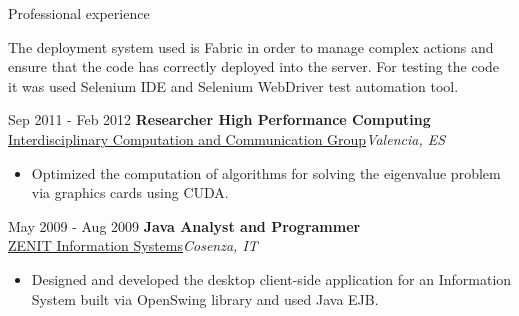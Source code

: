 \begin{cvlist}{Professional experience}
\begin{small}
\begin{itemize}
{            The deployment system used is Fabric in order
            to manage complex actions and ensure that the code
            has correctly deployed into the server.
            For testing the code it was
            used Selenium IDE and Selenium WebDriver
            test automation tool.
}
    \end{itemize}
  \end{small}
  \item[\footnotesize{Sep 2011 - Feb 2012}] \textbf{Researcher High Performance Computing}\\
  \href{http://www.inco2.upv.es/menu.php}{Interdisciplinary Computation and Communication Group}\hfill\textit{Valencia, ES}
  \begin{small}
    \begin{itemize}
      \item Optimized the computation of algorithms for solving
            the eigenvalue problem via graphics cards using CUDA.
    \end{itemize}
  \end{small}
  \item[\footnotesize{May 2009 - Aug 2009}] \textbf{Java Analyst and Programmer}\\
  \href{http://www.zenitlab.it/}{ZENIT Information Systems}\hfill\textit{Cosenza, IT}
  \begin{small}
    \begin{itemize}
      \item Designed and developed the desktop client-side
            application for an Information System built
            via OpenSwing library and used Java EJB.
    \end{itemize}
  \end{small}
\end{cvlist}